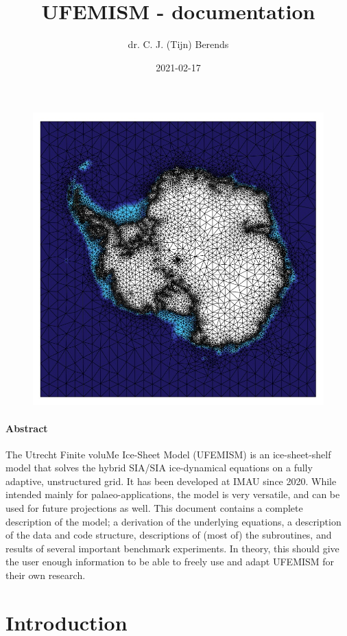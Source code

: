 \documentclass{article}
\title{UFEMISM - documentation}
\date{2021-02-17}
\author{dr. C. J. (Tijn) Berends}
\begin{document}
  \maketitle

  \begin{figure}[H]
    \centering
    \includegraphics[width=0.8\linewidth]{Fig_UFEMISM.jpg}
  \end{figure}  

  \paragraph{Abstract}
  
The Utrecht Finite voluMe Ice-Sheet Model (UFEMISM) is an ice-sheet-shelf model that solves the hybrid SIA/SIA ice-dynamical equations on a fully adaptive, unstructured grid. It has been developed at IMAU since 2020. While intended mainly for palaeo-applications, the model is very versatile, and can be used for future projections as well. This document contains a complete description of the model; a derivation of the underlying equations, a description of the data and code structure, descriptions of (most of) the subroutines, and results of several important benchmark experiments. In theory, this should give the user enough information to be able to freely use and adapt UFEMISM for their own research.
  
\newpage
\tableofcontents

\newpage
{}

\section{Introduction}
\end{document}
